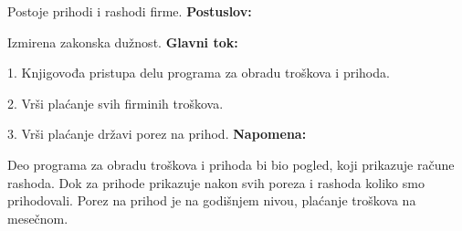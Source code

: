 Postoje prihodi i rashodi firme.
\newline
\textbf{Postuslov:}

Izmirena zakonska dužnost.
\newline
\textbf{Glavni tok:}

1. Knjigovođa pristupa delu programa za obradu troškova i prihoda.

2. Vrši plaćanje svih firminih troškova.

3. Vrši plaćanje državi porez na prihod.
\newline
\textbf{Napomena:}

Deo programa za obradu troškova i prihoda bi bio pogled, koji prikazuje račune rashoda. Dok za prihode prikazuje nakon svih poreza i rashoda koliko smo prihodovali.
Porez na prihod je na godišnjem nivou, plaćanje troškova na mesečnom.

\clearpage